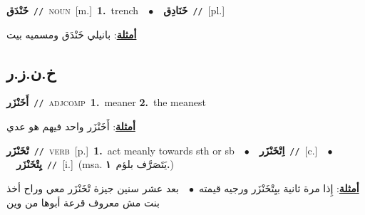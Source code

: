 \documentclass[10pt,a4paper,twoside]{article} %
\begin{document}
\begin{multicols}{2}
{\setlength\topsep{0pt}\textbf{\foreignlanguage{arabic}{خَنْدَق}}\ {\color{gray}\texttt{//}\color{black}}\ \textsc{noun}\ [m.]\ \textbf{1.}~trench\ \ $\bullet$\ \ \setlength\topsep{0pt}\textbf{\foreignlanguage{arabic}{خَنَادِق}}\ {\color{gray}\texttt{//}\color{black}}\ [pl.]\  \begin{flushright}\color{gray}\foreignlanguage{arabic}{\textbf{\underline{\foreignlanguage{arabic}{أمثلة}}}: بانيلي خَنْدَق ومسميه بيت}\end{flushright}\color{black}} \vspace{2mm}

\vspace{-3mm}
\subsection*{\color{blue}\foreignlanguage{arabic}{خ.ن.ز.ر}\color{blue}{}} 

{\setlength\topsep{0pt}\textbf{\foreignlanguage{arabic}{أَخَنْزَر}}\ {\color{gray}\texttt{//}\color{black}}\ \textsc{adj\textunderscore comp}\ \textbf{1.}~meaner  \textbf{2.}~the meanest\  \begin{flushright}\color{gray}\foreignlanguage{arabic}{\textbf{\underline{\foreignlanguage{arabic}{أمثلة}}}: أَخَنْزَر واحد فيهم هو عدي}\end{flushright}\color{black}} \vspace{2mm}

{\setlength\topsep{0pt}\textbf{\foreignlanguage{arabic}{تْخَنْزَر}}\ {\color{gray}\texttt{//}\color{black}}\ \textsc{verb}\ [p.]\ \textbf{1.}~act meanly towards sth or sb\ \ $\bullet$\ \ \setlength\topsep{0pt}\textbf{\foreignlanguage{arabic}{اِتْخَنْزَر}}\ {\color{gray}\texttt{//}\color{black}}\ [c.]\ \ $\bullet$\ \ \setlength\topsep{0pt}\textbf{\foreignlanguage{arabic}{يِتْخَنْزَر}}\ {\color{gray}\texttt{//}\color{black}}\ [i.]\ \color{gray}(msa. \foreignlanguage{arabic}{يَتَصَرَّف بلؤم}~\foreignlanguage{arabic}{\textbf{١.}})\color{black}\  \begin{flushright}\color{gray}\foreignlanguage{arabic}{\textbf{\underline{\foreignlanguage{arabic}{أمثلة}}}: إِذا مرة ثانية بيِتْخَنْزَر ورجيه قيمته\ $\bullet$\ \  بعد عشر سنين جيزة تْخَنْزَر معي وراح أخذ بنت مش معروف قرعة أبوها من وين}\end{flushright}\color{black}} \vspace{2mm}


\end{multicols}
\end{document}

